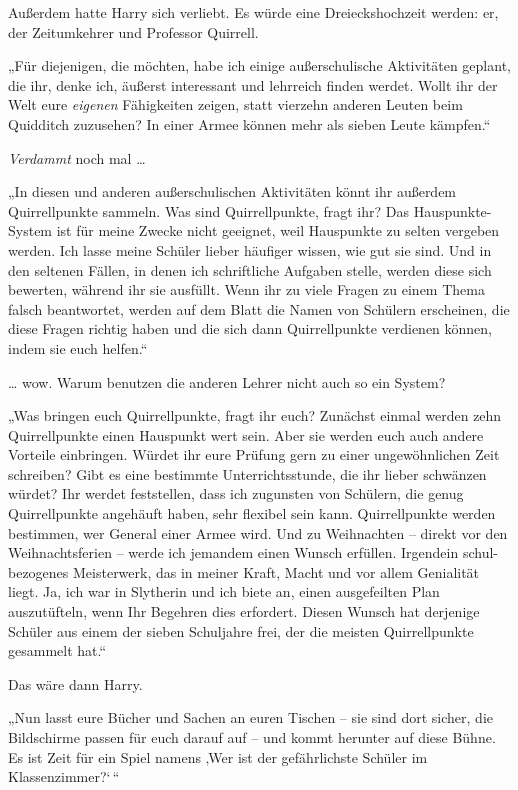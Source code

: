 {Außerdem hatte Harry sich verliebt. Es würde eine Dreieckshochzeit werden: er, der Zeitumkehrer und Professor Quirrell.

„Für diejenigen, die möchten, habe ich einige außerschulische Aktivitäten geplant, die ihr, denke ich, äußerst interessant und lehrreich finden werdet. Wollt ihr der Welt eure \emph{eigenen} Fähigkeiten zeigen, statt vierzehn anderen Leuten beim Quidditch zuzusehen? In einer Armee können mehr als sieben Leute kämpfen.“

\emph{Verdammt} noch mal …

„In diesen und anderen außerschulischen Aktivitäten könnt ihr außerdem Quirrellpunkte sammeln. Was sind Quirrellpunkte, fragt ihr? Das Hauspunkte-System ist für meine Zwecke nicht geeignet, weil Hauspunkte zu selten vergeben werden. Ich lasse meine Schüler lieber häufiger wissen, wie gut sie sind. Und in den seltenen Fällen, in denen ich schriftliche Aufgaben stelle, werden diese sich bewerten, während ihr sie ausfüllt. Wenn ihr zu viele Fragen zu einem Thema falsch beantwortet, werden auf dem Blatt die Namen von Schülern erscheinen, die diese Fragen richtig haben und die sich dann Quirrellpunkte verdienen können, indem sie euch helfen.“

… wow. Warum benutzen die anderen Lehrer nicht auch so ein System?

„Was bringen euch Quirrellpunkte, fragt ihr euch? Zunächst einmal werden zehn Quirrellpunkte einen Hauspunkt wert sein. Aber sie werden euch auch andere Vorteile einbringen. Würdet ihr eure Prüfung gern zu einer ungewöhnlichen Zeit schreiben? Gibt es eine bestimmte Unterrichtsstunde, die ihr lieber schwänzen würdet? Ihr werdet feststellen, dass ich zugunsten von Schülern, die genug Quirrellpunkte angehäuft haben, sehr flexibel sein kann. Quirrellpunkte werden bestimmen, wer General einer Armee wird. Und zu Weihnachten -- direkt vor den Weihnachtsferien -- werde ich jemandem einen Wunsch erfüllen. Irgendein schul-bezogenes Meisterwerk, das in meiner Kraft, Macht und vor allem Genialität liegt. Ja, ich war in Slytherin und ich biete an, einen ausgefeilten Plan auszutüfteln, wenn Ihr Begehren dies erfordert. Diesen Wunsch hat derjenige Schüler aus einem der sieben Schuljahre frei, der die meisten Quirrellpunkte gesammelt hat.“

Das wäre dann Harry.

„Nun lasst eure Bücher und Sachen an euren Tischen -- sie sind dort sicher, die Bildschirme passen für euch darauf auf -- und kommt herunter auf diese Bühne. Es ist Zeit für ein Spiel namens ‚Wer ist der gefährlichste Schüler im Klassenzimmer?`\,“

}
